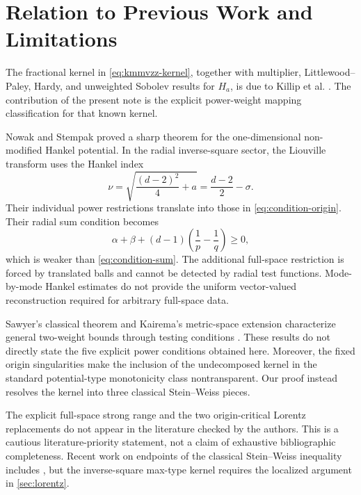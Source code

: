\documentclass[11pt]{amsart}
\numberwithin{equation}{section}
\theoremstyle{plain}
\theoremstyle{definition}
\theoremstyle{remark}
\newcommand{\Ha}{H_a}
\begin{document}
\section{Relation to Previous Work and Limitations}
\label{sec:previous-work}

The fractional kernel in \cref{eq:kmmvzz-kernel}, together with multiplier, Littlewood--Paley, Hardy, and unweighted Sobolev results for $\Ha$, is due to Killip et al. \cite{KillipEtAl2018}. The contribution of the present note is the explicit power-weight mapping classification for that known kernel.

Nowak and Stempak \cite[Theorem~2.10]{NowakStempak2017} proved a sharp theorem for the one-dimensional non-modified Hankel potential. In the radial inverse-square sector, the Liouville transform uses the Hankel index
\begin{equation}
 \nu
 =\sqrt{\frac{(d-2)^2}{4}+a}
 =\frac{d-2}{2}-\sigma.
 \label{eq:hankel-index}
\end{equation}
Their individual power restrictions translate into those in \cref{eq:condition-origin}. Their radial sum condition becomes
\begin{equation}
 \alpha+\beta
 +(d-1)\left(\frac1p-\frac1q\right)
 \ge0,
 \label{eq:radial-sum-condition}
\end{equation}
which is weaker than \cref{eq:condition-sum}. The additional full-space restriction is forced by translated balls and cannot be detected by radial test functions. Mode-by-mode Hankel estimates do not provide the uniform vector-valued reconstruction required for arbitrary full-space data.

Sawyer's classical theorem and Kairema's metric-space extension characterize general two-weight bounds through testing conditions \cite{Sawyer1988,Kairema2013}. These results do not directly state the five explicit power conditions obtained here. Moreover, the fixed origin singularities make the inclusion of the undecomposed kernel in the standard potential-type monotonicity class nontransparent. Our proof instead resolves the kernel into three classical Stein--Weiss pieces.

The explicit full-space strong range and the two origin-critical Lorentz replacements do not appear in the literature checked by the authors. This is a cautious literature-priority statement, not a claim of exhaustive bibliographic completeness. Recent work on endpoints of the classical Stein--Weiss inequality includes \cite{SunWang2026}, but the inverse-square max-type kernel requires the localized argument in \cref{sec:lorentz}.
\end{document}
